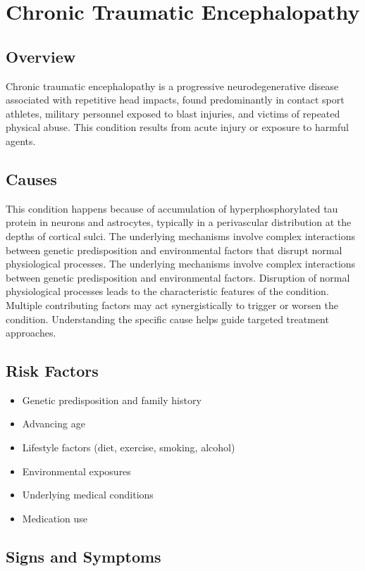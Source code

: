 \chapter{Chronic Traumatic Encephalopathy}
\label{sec:Chronic Traumatic Encephalopathy}

\section{Overview}
Chronic traumatic encephalopathy is a progressive neurodegenerative disease associated with repetitive head impacts, found predominantly in contact sport athletes, military personnel exposed to blast injuries, and victims of repeated physical abuse. This condition results from acute injury or exposure to harmful agents.
\section{Causes}
This condition happens because of accumulation of hyperphosphorylated tau protein in neurons and astrocytes, typically in a perivascular distribution at the depths of cortical sulci. The underlying mechanisms involve complex interactions between genetic predisposition and environmental factors that disrupt normal physiological processes. The underlying mechanisms involve complex interactions between genetic predisposition and environmental factors. Disruption of normal physiological processes leads to the characteristic features of the condition. Multiple contributing factors may act synergistically to trigger or worsen the condition. Understanding the specific cause helps guide targeted treatment approaches.
\section{Risk Factors}


\begin{itemize}[noitemsep]
  \item Genetic predisposition and family history
  \item Advancing age
  \item Lifestyle factors (diet, exercise, smoking, alcohol)
  \item Environmental exposures
  \item Underlying medical conditions
  \item Medication use
\end{itemize}
\section{Signs and Symptoms}

